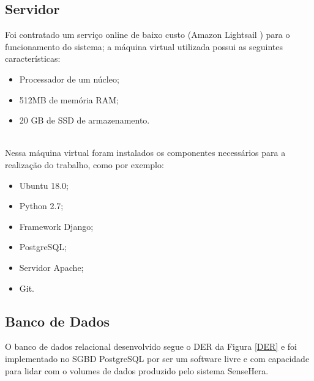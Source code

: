 \subsection{Servidor}
\nul \quad Foi contratado um serviço online de baixo custo (Amazon Lightsail \cite{lightsail}) para o funcionamento do sistema; a máquina virtual utilizada possui as seguintes características:
\begin{itemize}
  \item Processador de um núcleo;
  \item 512MB de memória RAM;
  \item 20 GB de SSD de armazenamento.
\end{itemize}
\\\null \quad Nessa máquina virtual foram instalados os componentes necessários para a realização do trabalho, como por exemplo:
\begin{itemize}
  \item Ubuntu 18.0;
  \item Python 2.7;
  \item Framework Django;
  \item PostgreSQL;
  \item Servidor Apache;
  \item Git.
\end{itemize}

\subsection{Banco de Dados}
\null \quad O banco de dados relacional desenvolvido segue o \acrfull{DER} da Figura \ref{DER} e foi implementado no \acrfull{SGBD} PostgreSQL por ser um software livre e com capacidade para lidar com o volumes de dados produzido pelo sistema SenseHera.

\newpage
